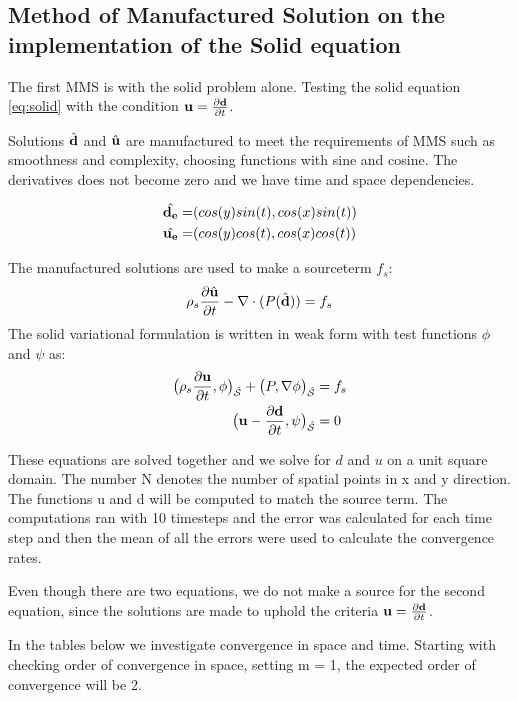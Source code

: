 \subsection{Method of Manufactured Solution on the implementation of the Solid equation}
The first MMS is with the solid problem alone. Testing the solid equation \ref{eq:solid} with the condition $\bold{u} = \frac{\partial \bold{d}}{\partial t}$.\newline

Solutions $\hat{\bold{d}}$ and $\hat{\bold{u}}$ are manufactured to meet the requirements of MMS such as smoothness and complexity, choosing functions with sine and cosine. The derivatives does not become zero and we have time and space dependencies. 

\begin{align*}
\hat{\bold{d_e}} =& ( cos(y)sin(t) , cos(x)sin(t) )\\
\hat{\bold{u_e}} =& ( cos(y)cos(t), cos(x)cos(t) )
\end{align*}
\newline

The manufactured solutions are used to make a sourceterm $f_s$:
$$\rho_s \frac{\partial \hat{\bold{u}}}{\partial t} - \nabla \cdot ( P(\hat{\bold{d}}) ) = f_s $$
The solid variational formulation is written in weak form with test functions $\phi$ and $\psi$ as:
\begin{align}
\big(\rho_s \frac{\partial \bold{u}}{\partial t},\phi \big)_{\mathcal{\hat{S}}} + \big(P, \nabla \phi \big)_{\mathcal{\hat{S}}} &=f_s \\
\big( \bold{u}- \frac{\partial \bold{d}}{\partial t} ,\psi \big)_{\mathcal{\hat{S}}} &= 0 
\end{align}

These equations are solved together and we solve for $d$ and $u$ on a unit square domain. The number N denotes the number of spatial points in x and y direction. The functions u and d will be computed to match the source term. 
The computations ran with 10 timesteps and the error was calculated for each time step and then the mean of all the errors were used to calculate the convergence rates.

Even though there are two equations, we do not make a source for the second equation, since the solutions are made to uphold the criteria $\bold{u} = \frac{\partial \bold{d}}{\partial t}$.\newline

In the tables below we investigate convergence in space and time.
Starting with checking order of convergence in space, setting m = 1, the expected order of convergence will be 2. 

